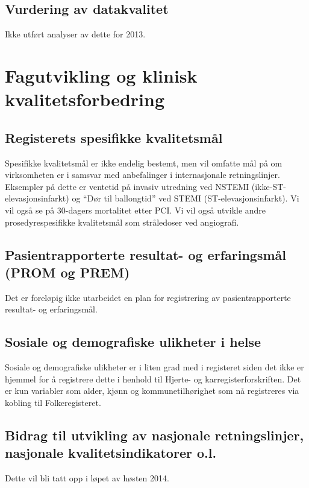 \documentclass[norsk, a4paper]{report}
\begin{document}
\section{Vurdering av datakvalitet}\label{sec:valdat}
Ikke utført analyser av dette for 2013.




\chapter{Fagutvikling og klinisk kvalitetsforbedring}\label{cha:fag}

\section{Registerets spesifikke kvalitetsmål}\label{sec:regspe}
Spesifikke kvalitetsmål er ikke endelig bestemt, men vil omfatte mål på om virksomheten er i samsvar med anbefalinger i internasjonale retningslinjer. Eksempler på dette er ventetid på invasiv utredning ved NSTEMI (ikke-ST-elevasjonsinfarkt) og ``Dør til ballongtid'' ved STEMI (ST-elevasjonsinfarkt). Vi vil også se på 30-dagers mortalitet etter PCI. Vi vil også utvikle andre prosedyrespesifikke kvalitetsmål som stråledoser ved angiografi.

\section{Pasientrapporterte resultat- og erfaringsmål (PROM og PREM)}\label{sec:pasutk}
Det er foreløpig ikke utarbeidet en plan for registrering av pasientrapporterte resultat- og erfaringsmål.

\section{Sosiale og demografiske ulikheter i helse}\label{sec:sosdem}
Sosiale og demografiske ulikheter er i liten grad med i registeret siden det ikke er hjemmel for å registrere dette i henhold til Hjerte- og karregisterforskriften. Det er kun variabler som alder, kjønn og kommunetilhørighet som nå registreres via kobling til Folkeregisteret.

\section{Bidrag til utvikling av nasjonale retningslinjer, nasjonale kvalitetsindikatorer o.l.}\label{sec:retut}
Dette vil bli tatt opp i løpet av høsten 2014.
\end{document}
